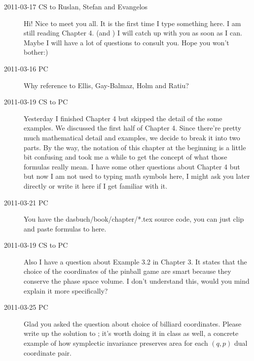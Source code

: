 \begin{description}
\item[2011-03-17 CS to Ruslan, Stefan and Evangelos]
   Hi! Nice to meet you all. It is the first time I type something here.
   I am still reading Chapter 4. (and ) I will catch up with
   you as soon as I can. Maybe I will have a lot of questions to consult
   you. Hope you won't bother:)

\item[2011-03-16 PC] Why reference to Ellis, Gay-Balmaz, Holm
                  and Ratiu?


\item[2011-03-19 CS to PC]

   Yesterday I finished Chapter 4 but skipped the detail of the some
   examples. We discussed the first half of Chapter 4. Since there're
   pretty much mathematical detail and examples, we decide to break it
   into two parts. By the way, the notation of this chapter at the
   beginning is a little bit confusing and took me a while to get the
   concept of what those formulas really mean. I have some other
   questions about Chapter 4 but but now I am not used to typing math
   symbols here, I might ask you later directly or write it here if I get
   familiar with it.

\item[2011-03-21 PC] You have the dasbuch/book/chapter/*.tex source
code, you can just clip and paste formulas to here.

\item[2011-03-19 CS to PC]
Also I have a question about Example 3.2 in Chapter 3. It states that
   the choice of the coordinates of the pinball game are smart because
   they conserve the phase space volume. I don't understand this, would
   you mind explain it more specifically?

\item[2011-03-25 PC]
Glad you asked the question about choice of billiard coordinates. Please
write up the solution to ; it's worth doing it in
class as well, a concrete example of how symplectic invariance preserves
area for each $(q,p)$ dual coordinate  pair.


\end{description}
